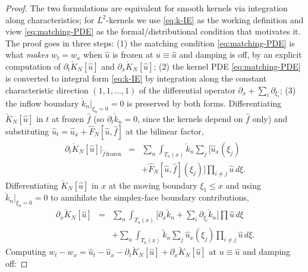 \documentclass[journal,twoside,web]{ieeecolor}
\begin{document}
\begin{proof}
The two formulations are equivalent for smooth kernels via integration along characteristics; for $L^2$-kernels we use \eqref{eq:k-IE} as the working definition and view \eqref{eq:matching-PDE} as the formal/distributional condition that motivates it. The proof goes in three steps: (1) the matching condition \eqref{eq:matching-PDE} is what \emph{makes} $w_t=w_x$ when $\hat u$ is frozen at $u\equiv\hat u$ and damping is off, by an explicit computation of $\partial_t \check K_N[\hat u]$ and $\partial_x \check K_N[\hat u]$; (2) the kernel PDE \eqref{eq:matching-PDE} is converted to integral form \eqref{eq:k-IE} by integration along the constant characteristic direction $(1,1,\ldots,1)$ of the differential operator $\partial_x+\sum_i\partial_{\xi_i}$; (3) the inflow boundary $\check k_n|_{\xi_n=0}=0$ is preserved by both forms.
Differentiating $\check K_N[\hat u]$ in $t$ at frozen $\hat f$ (so $\partial_t\check k_n=0$, since the kernels depend on $\hat f$ only) and substituting $\hat u_t=\hat u_x+\hat F_N[\hat u,\hat f]$ at the bilinear factor,
\begin{eqnarray}
\partial_t \check K_N[\hat u]\Big|_{\hat f\,\text{frozen}} &=& \sum_n\!\int_{T_n(x)}\!\!\check k_n\sum_j[\hat u_x(\xi_j) \nonumber\\
&& +\hat F_N[\hat u,\hat f](\xi_j)]\!\prod_{i\ne j}\!\hat u\,d\xi. \label{eq:partialt-K-formal}
\end{eqnarray}
Differentiating $\check K_N[\hat u]$ in $x$ at the moving boundary $\xi_1\le x$ and using $\check k_n|_{\xi_n=0}=0$ to annihilate the simplex-face boundary contributions,
\begin{eqnarray}
\partial_x \check K_N[\hat u] &=& \sum_n\!\int_{T_n(x)}\!\!\bigl[\partial_x\check k_n+\textstyle\sum_i\partial_{\xi_i}\check k_n\bigr]\prod\hat u\,d\xi \nonumber\\
&& +\sum_n\!\int_{T_n(x)}\!\!\check k_n\sum_j\hat u_x(\xi_j)\!\prod_{i\ne j}\!\hat u\,d\xi. \label{eq:partialx-K-formal}
\end{eqnarray}
Computing $w_t-w_x=\hat u_t-\hat u_x-\partial_t \check K_N[\hat u]+\partial_x \check K_N[\hat u]$ at $u\equiv\hat u$ and damping off:

\end{proof}
\end{document}
